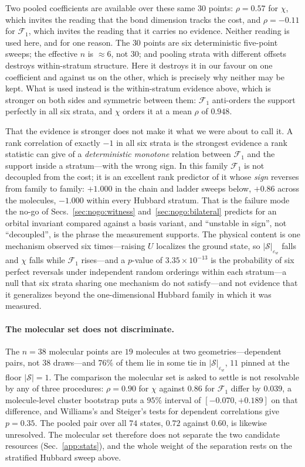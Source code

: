 Two pooled coefficients are available over these same $30$ points: $\rho=0.57$ for $\chi$, which
invites the reading that the bond dimension tracks the cost, and $\rho=-0.11$ for
$\mathcal F_1$, which invites the reading that it carries no evidence. Neither reading is used
here, and for one reason. The $30$
points are six deterministic five-point sweeps; the effective $n$ is $\approx6$, not $30$; and pooling
strata with different offsets destroys within-stratum structure. Here it destroys it in our favour on
one coefficient and against us on the other, which is precisely why neither may be kept. What is used
instead is the within-stratum evidence above, which is stronger on both sides and symmetric between
them:
$\mathcal F_1$ anti-orders the support perfectly in all six strata, and $\chi$ orders it at a mean
$\rho$ of $0.948$.

That the evidence is stronger does not make it what we were about to call it. A rank correlation of
exactly $-1$ in all six strata is the strongest evidence a rank statistic can give of a
\emph{deterministic monotone} relation between $\mathcal F_1$ and the support inside a stratum---with
the wrong sign. In this family $\mathcal F_1$ is not decoupled from the cost; it is an excellent rank
predictor of it whose \emph{sign} reverses from family to family: $+1.000$ in the chain and ladder
sweeps below, $+0.86$ across the molecules, $-1.000$ within every Hubbard stratum. That is the failure
mode the no-go of Secs.~\ref{sec:nogo:witness} and~\ref{sec:nogo:bilateral} predicts for an orbital
invariant compared against a basis variant, and ``unstable in sign'', not ``decoupled'', is the phrase
the measurement supports. The physical content is one mechanism observed six times---raising $U$
localizes the ground state, so $|\mathcal S|_{\varepsilon_w}$ falls and $\chi$ falls while
$\mathcal F_1$ rises---and a $p$-value of $3.35\times10^{-13}$ is the probability of six perfect reversals under independent random orderings within each stratum---a null that six strata sharing one mechanism do not satisfy---and not evidence that it generalizes beyond the one-dimensional
Hubbard family in which it was measured.

\paragraph{The molecular set does not discriminate.} The $n=38$ molecular
points are $19$ molecules at two geometries---dependent pairs, not $38$ draws---and $76\%$ of them lie
in some tie in $|\mathcal S|_{\varepsilon_w}$, $11$ pinned at the floor $|\mathcal S|=1$. The
comparison the molecular set is asked to settle is not resolvable by any of three procedures: $\rho=0.90$ for $\chi$ against
$0.86$ for $\mathcal F_1$ differ by $0.039$, a molecule-level cluster bootstrap puts a $95\%$ interval
of $[-0.070,+0.189]$ on that difference, and Williams's and Steiger's tests for dependent correlations
give $p=0.35$. The pooled pair over all $74$ states, $0.72$ against $0.60$, is likewise unresolved. The molecular set therefore does not separate the two candidate resources (Sec.~\ref{app:stats}), and the whole weight of the separation rests on the stratified
Hubbard sweep above.

